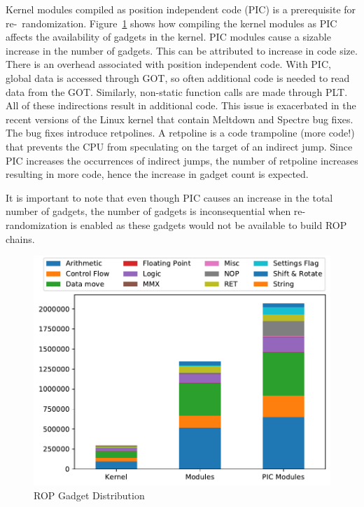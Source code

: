 Kernel modules compiled as position independent code (PIC) is a prerequisite for re-~randomization. Figure~\ref{fig:gadget_dist} shows how compiling the kernel modules as PIC affects the availability of gadgets in the kernel. PIC modules cause a sizable increase in the number of gadgets. This can be attributed to increase in code size. There is an overhead associated with position independent code. With PIC, global data is accessed through GOT, so often additional code is needed to read data from the GOT. Similarly, non-static function calls are made through PLT. All of these indirections result in additional code.
This issue is exacerbated in the recent versions of the Linux kernel that contain Meltdown and Spectre bug fixes. The bug fixes introduce retpolines. A retpoline is a code trampoline (more code!) that prevents the CPU from speculating on the target of an indirect jump. Since PIC increases the occurrences of indirect jumps, the number of retpoline increases resulting in more code, hence the increase in gadget count is expected.

It is important to note that even though PIC causes an increase in the total number of gadgets, the number of gadgets is inconsequential when re-randomization is enabled as these gadgets would not be available to build ROP chains.

\begin{figure}[ht!]
\centering
\includegraphics[width=0.6\columnwidth]{charts/gadget_distribution.pdf}
\caption{ROP Gadget Distribution}
\label{fig:gadget_dist}
\end{figure}

